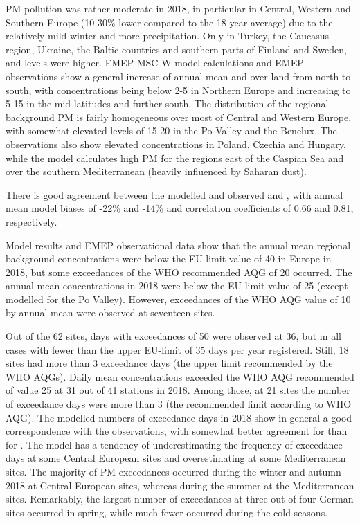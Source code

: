 PM pollution was rather moderate in 2018, in particular in Central, Western and Southern Europe (10-30\% lower compared to the 18-year average) due to the relatively mild winter and more precipitation. Only in Turkey, the Caucasus region, Ukraine, the Baltic countries and southern parts of Finland and Sweden, \PM[10] and \PM[2.5] levels were higher. 
EMEP MSC-W model calculations and EMEP observations show a general increase of annual mean \PM[10] and \PM[2.5] over land from north to south, with concentrations being below 2-5 \ug in Northern
Europe and increasing to 5-15 \ug in the mid-latitudes and further south.
The distribution of the regional background PM is fairly homogeneous over most of Central and Western Europe, with somewhat elevated \PM[10] levels of 15-20 \ug in the Po Valley and the Benelux. The observations also show elevated \PM[10] concentrations in Poland, Czechia and Hungary, while the model calculates high PM for the regions east of the Caspian Sea and over the southern Mediterranean (heavily influenced by Saharan dust). 

There is good agreement between the modelled and observed \PM[10] and \PM[2.5], with annual mean model biases of -22\% and -14\% and correlation coefficients of 0.66 and 0.81, respectively.

Model results and EMEP observational data show that the annual mean regional background \PM[10] concentrations were below the EU limit value of 40 \ug in Europe in 2018, but some exceedances of the WHO recommended AQG of 20 \ug occurred. 
The annual mean \PM[2.5] concentrations in 2018 were below the EU limit value of 25 \ug (except modelled \PM[2.5] for the Po Valley). However, exceedances of the WHO AQG value of 10 \ug by annual mean \PM[2.5] were observed at seventeen sites.%

Out of the 62 sites, days with \PM[10] exceedances of 50 \ug were observed at 36, but in all cases with fewer than the upper EU-limit of 35 days per year registered. Still, 18 sites had more than 3 exceedance days (the upper limit recommended by the WHO AQGs). %
Daily mean \PM[2.5] concentrations exceeded the WHO AQG recommended of value 25 \ug at 31 out of 41 stations in 2018. Among those, at 21 sites the number of exceedance days were more than 3 (the recommended limit according to WHO AQG).  
The modelled numbers of exceedance days in 2018 show in general a good correspondence with the observations, with somewhat better agreement for \PM[10] than for \PM[2.5]. The model has a tendency of underestimating the frequency of exceedance days at some Central European sites
and overestimating at some Mediterranean sites. 
The majority of PM exceedances occurred during the winter and autumn 2018 at Central European sites, whereas during the summer at the Mediterranean sites. Remarkably, the largest number of \PM[2.5] exceedances at three out of four German sites occurred in spring, while much fewer occurred during the cold seasons.



